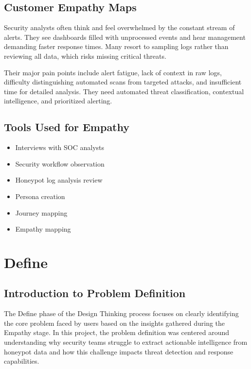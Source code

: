 \documentclass[12pt,a4paper]{report}
\begin{document}
\section{Customer Empathy Maps}

Security analysts often think and feel overwhelmed by the constant stream of alerts. They see dashboards filled with unprocessed events and hear management demanding faster response times. Many resort to sampling logs rather than reviewing all data, which risks missing critical threats.

Their major pain points include alert fatigue, lack of context in raw logs, difficulty distinguishing automated scans from targeted attacks, and insufficient time for detailed analysis. They need automated threat classification, contextual intelligence, and prioritized alerting.

\section{Tools Used for Empathy}

\begin{itemize}
\item Interviews with SOC analysts
\item Security workflow observation
\item Honeypot log analysis review
\item Persona creation
\item Journey mapping
\item Empathy mapping
\end{itemize}


\chapter{Define}
\thispagestyle{mainpages}

\section{Introduction to Problem Definition}

The Define phase of the Design Thinking process focuses on clearly identifying the core problem faced by users based on the insights gathered during the Empathy stage. In this project, the problem definition was centered around understanding why security teams struggle to extract actionable intelligence from honeypot data and how this challenge impacts threat detection and response capabilities.
\end{document}
